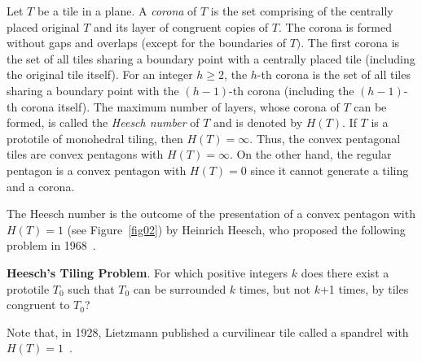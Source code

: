 \documentclass[11pt, a4paper]{article}
\begin{document}
Let $T$ be a tile in a plane. A \textit{corona} of $T$ is the set comprising of the centrally 
placed original $T$ and its layer of congruent copies of $T$. The corona is formed 
without gaps and overlaps (except for the boundaries of $T)$. The first corona 
is the set of all tiles sharing a boundary point with a centrally placed tile (including 
the original tile itself). For  an integer $h \ge 2$, the $h$-th corona is 
the set of all tiles sharing a boundary point with the $(h - 1)$-th corona 
(including the $(h - 1)$-th corona itself). The maximum number of layers, 
whose corona of $T$ can be formed, is called the \textit{Heesch number} of $T$ and is 
denoted by $H(T)$. If $T$ is a prototile of monohedral tiling, then $H(T) = \infty $. 
Thus, the convex pentagonal tiles are convex pentagons with $H(T) = \infty $. On 
the other hand, the regular pentagon is a convex pentagon with $H(T) = 0$ 
since it cannot generate a tiling and a corona.





The Heesch number is the outcome of the presentation of a convex pentagon 
with $H(T) = 1$ (see Figure~\ref{fig02}) by Heinrich Heesch, who proposed the 
following problem in 1968~\cite{Agaoka_2005, Brass_2005, G_and_S_1987, 
Mann_2004, Wiki_HeeP}.



\bigskip
\noindent
\textbf{Heesch's Tiling Problem}. For which positive integers $k$ does there 
exist a prototile $T_{0}$ such that $T_{0}$ can be surrounded $k$ times, but not 
$k$+1 times, by tiles congruent to $T_{0}$?

\bigskip



Note that, in 1928, Lietzmann published a curvilinear tile called a spandrel 
with $H(T) = 1$~\cite{Mann_2004}.
\end{document}
